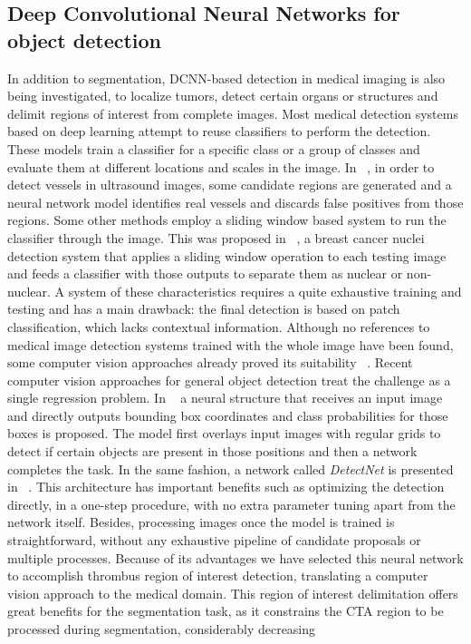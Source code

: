 \documentclass[preprint,authoryear,12pt]{elsarticle}
\begin{document}


\subsection{Deep Convolutional Neural Networks for object detection }
In addition to segmentation, DCNN-based detection in medical imaging is also being investigated, to localize tumors, detect certain organs or structures and delimit regions of interest from complete images. Most medical detection systems based on deep learning attempt to reuse classifiers to perform the detection. These models train a classifier for a specific class or a group of classes and evaluate them at different locations and scales in the image. In ~\citep{Smi1}, in order to detect vessels in ultrasound images, some candidate regions are generated and a neural network model identifies real vessels and discards false positives from those regions. Some other methods employ a sliding window based system to run the classifier through the image. This was proposed in ~\citep{Xu1}, a breast cancer nuclei detection system that applies a sliding window operation to each testing image and feeds a classifier with those outputs to separate them as nuclear or non-nuclear. A system of these characteristics requires a quite exhaustive training and testing and has a main drawback: the final detection is based on patch classification, which lacks contextual information. Although no references to medical image detection systems trained with the whole image have been found, some computer vision approaches already proved its suitability ~\citep{Bar1,Shin1}. Recent computer vision approaches for general object detection treat the challenge as a single regression problem. In ~\citep{Red1} a neural structure that receives an input image and directly outputs bounding box coordinates and class probabilities for those boxes is proposed. The model first overlays input images with regular grids to detect if certain objects are present in those positions and then a network completes the task. In the same fashion, a network called \textit{DetectNet} is presented in ~\citep{Detectnet}. This architecture has important benefits such as optimizing the detection directly, in a one-step procedure, with no extra parameter tuning apart from the network itself. Besides, processing images once the model is trained is straightforward, without any exhaustive pipeline of candidate proposals or multiple processes. Because of its advantages we have selected this neural network to accomplish thrombus region of interest detection, translating a computer vision approach to the medical domain. This region of interest delimitation offers great benefits for the segmentation task, as it constrains the CTA region to be processed during segmentation, considerably decreasing 
\end{document}
